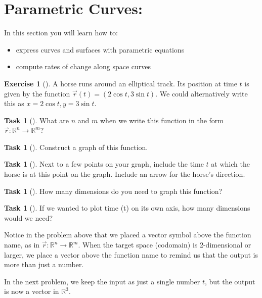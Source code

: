 \documentclass[10pt,]{book}
\theoremstyle{plain}
\theoremstyle{definition}
\theoremstyle{definition}
\theoremstyle{definition}
\theoremstyle{definition}
\newtheorem{exploration}[project]{Exercise}
\newtheorem{task}[project]{Task}
\theoremstyle{definition}
\numberwithin{equation}{section}
\begin{document}
\section[{Parametric Curves:}]{Parametric Curves:}\label{section-16}
In this section you will learn how to: \leavevmode%
\begin{itemize}[label=\textbullet]
\item{}express curves and surfaces with parametric equations%
\item{}compute rates of change along space curves%
\end{itemize}
%
\begin{exploration}[]\label{prob_parametric_curve_in_plane}
A horse runs around an elliptical track. Its position at time \(t\) is given by the function \(\vec r(t)=(2\cos t, 3\sin t).\) We could alternatively write this as \(x=2\cos t, y=3\sin t\).%
\begin{task}[]\label{task-169}
What are \(n\) and \(m\) when we write this function in the form  \(\vec r\colon {\mathbb{R}}^n\to {\mathbb{R}}^m\)?%
\end{task}
\begin{task}[]\label{task-170}
Construct a graph of this function.%
\end{task}
\begin{task}[]\label{task-171}
Next to a few points on your graph, include the time \(t\) at which the horse is at this point on the graph. Include an arrow for the horse's direction.%
\end{task}
\begin{task}[]\label{task-172}
How many dimensions do you need to graph this function?%
\end{task}
\begin{task}[]\label{task-173}
If we wanted to plot time (t) on its own axis, how many dimensions would we need?%
\end{task}
\end{exploration}
Notice in the problem above that we placed a vector symbol above the function name, as in \(\vec r\colon {\mathbb{R}}^n\to {\mathbb{R}}^m\). When the target space (codomain) is 2-dimensional or larger, we place a vector above the function name to remind us that the output is more than just a number.%
\par
In the next problem, we keep the input as just a single number \(t\), but the output is now a vector in \(\mathbb{R}^3\).%
\end{document}
